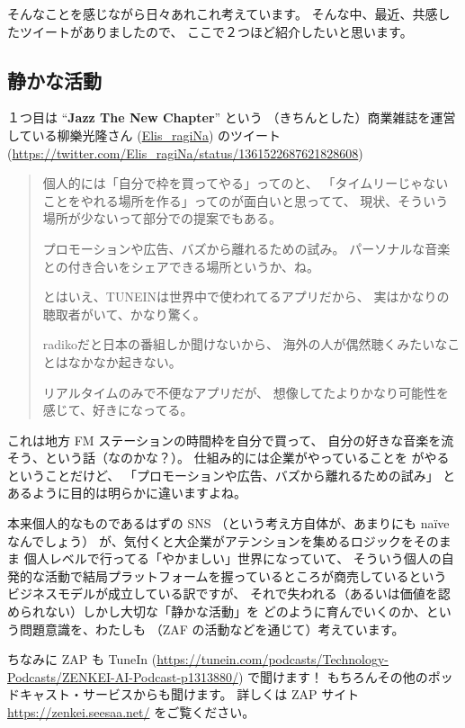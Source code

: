 \documentclass[dvipdfmx,autodetect-engine,10pt,b5paper,papersize,openany,dvipsnames]{jsbook}
\begin{document}
\begin{multicols}{2}
そんなことを感じながら日々あれこれ考えています。
そんな中、最近、共感したツイートがありましたので、
ここで２つほど紹介したいと思います。

\subsection{静かな活動}
１つ目は
``{\bfseries Jazz The New Chapter}'' という
（きちんとした）商業雑誌を運営している柳樂光隆さん
(\href{https://twitter.com/Elis_ragiNa/}{Elis\_ragiNa})
のツイート
(\url{https://twitter.com/Elis_ragiNa/status/1361522687621828608})
\begin{quotation}
  \noindent
  個人的には「自分で枠を買ってやる」ってのと、
  「タイムリーじゃないことをやれる場所を作る」ってのが面白いと思ってて、
  現状、そういう場所が少ないって部分での提案でもある。

  プロモーションや広告、バズから離れるための試み。
  パーソナルな音楽との付き合いをシェアできる場所というか、ね。

  とはいえ、TUNEINは世界中で使われてるアプリだから、
  実はかなりの聴取者がいて、かなり驚く。

  radikoだと日本の番組しか聞けないから、
  海外の人が偶然聴くみたいなことはなかなか起きない。

  リアルタイムのみで不便なアプリだが、
  想像してたよりかなり可能性を感じて、好きになってる。
\end{quotation}
これは地方 FM ステーションの時間枠を自分で買って、
自分の好きな音楽を流そう、という話（なのかな？）。
仕組み的には企業がやっていることを
がやるということだけど、
「プロモーションや広告、バズから離れるための試み」
とあるように目的は明らかに違いますよね。

本来個人的なものであるはずの SNS
（という考え方自体が、あまりにも na\"{i}ve なんでしょう）
が、気付くと大企業がアテンションを集めるロジックをそのまま
個人レベルで行ってる「やかましい」世界になっていて、
そういう個人の自発的な活動で結局プラットフォームを握っているところが商売しているという
ビジネスモデルが成立している訳ですが、
それで失われる（あるいは価値を認められない）しかし大切な「静かな活動」を
どのように育んでいくのか、という問題意識を、わたしも
（ZAF の活動などを通じて）考えています。
	  
ちなみに ZAP も TuneIn
(\url{https://tunein.com/podcasts/Technology-Podcasts/ZENKEI-AI-Podcast-p1313880/}) で聞けます！
もちろんその他のポッドキャスト・サービスからも聞けます。
詳しくは ZAP サイト \url{https://zenkei.seesaa.net/} をご覧ください。



\end{multicols}
\end{document}
